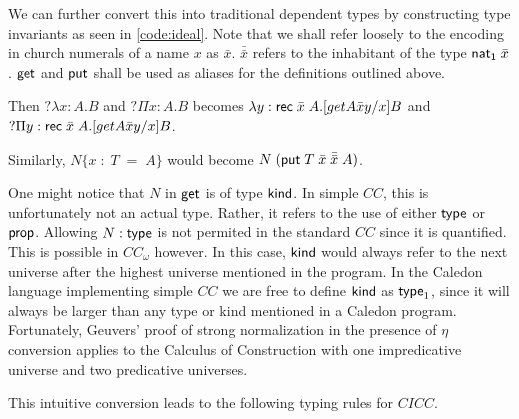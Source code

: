 We can further convert this into traditional dependent types by constructing
 type invariants as seen in \ref{code:ideal}.   Note that we shall refer loosely 
to the encoding in church numerals of a name $x$ as $\bar{x}$.  $\bar{\bar{x}}$ refers to the 
inhabitant of the type $\mathsf{nat_1}\;\bar{x}$.   $\mathsf{get}$ and $\mathsf{put}$ shall be used as 
aliases for the definitions outlined above.

Then $?\lambda x : A . B$ and $?\Pi x : A . B$ 
becomes $\lambda y : \mathsf{rec}\;\bar{x}\;A . [get A \bar{x} y / x ] B$
and $?\Pi y : \mathsf{rec}\;\bar{x}\;A . [get A \bar{x} y / x ] B$.

Similarly, $N \{ x\; : \; T \; = \;A \} $
would become $N\;( \mathsf{put} \; T \; \bar{x} \; \bar{\bar{x}} \; A)$.

One might notice that $N$ in $\mathsf{get}$ is of type $\mathsf{kind}$.  
In simple $CC$, this is unfortunately not an actual type. 
Rather, it refers to the use of either $\mathsf{type}$ or $\mathsf{prop}$.  
Allowing $N : \mathsf{type}$ is not permited in the standard $CC$ since it is quantified.
This is possible in $CC_\omega$ however.
In this case, $\mathsf{kind}$ would always refer to the next universe after the highest
universe mentioned in the program.
In the Caledon language implementing simple $CC$ we are free to define 
$\mathsf{kind}$ as $\mathsf{type}_1$, since it will always be larger than any
type or kind mentioned in a Caledon program.  
Fortunately, Geuvers' proof \citep{geuvers1993logics} of strong normalization in the presence of 
$\eta$ conversion applies to the Calculus of Construction with one impredicative universe and two predicative
universes.

This intuitive conversion leads to the following typing rules for $CICC$.

